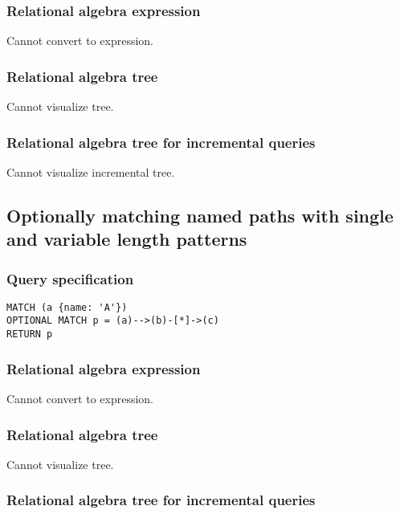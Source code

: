 \subsubsection*{Relational algebra expression}

Cannot convert to expression.

\subsubsection*{Relational algebra tree}

Cannot visualize tree.

\subsubsection*{Relational algebra tree for incremental queries}

Cannot visualize incremental tree.

\subsection{Optionally matching named paths with single and variable length patterns}

\subsubsection*{Query specification}

\begin{lstlisting}
MATCH (a {name: 'A'})
OPTIONAL MATCH p = (a)-->(b)-[*]->(c)
RETURN p
\end{lstlisting}

\subsubsection*{Relational algebra expression}

Cannot convert to expression.

\subsubsection*{Relational algebra tree}

Cannot visualize tree.

\subsubsection*{Relational algebra tree for incremental queries}

